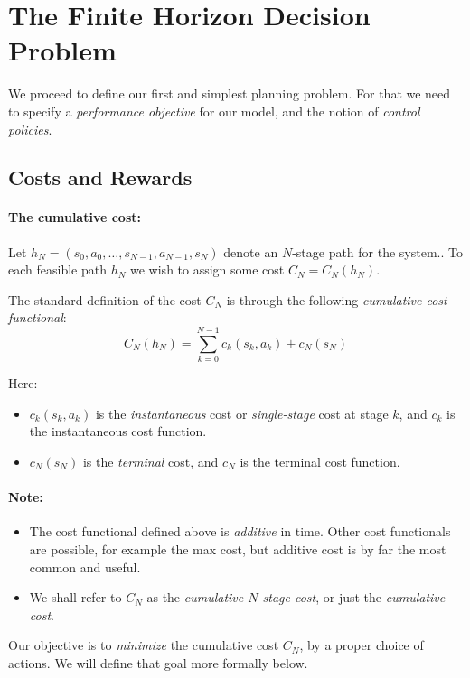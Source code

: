 \section{The Finite Horizon Decision Problem}

We proceed to define our first and simplest planning problem. For that we need to specify a \emph{performance objective} for our model, and the notion of \emph{control policies}.

\subsection{Costs and Rewards}

\paragraph{The cumulative cost:}  Let ${h_N} = ({s_0},{a_0}, \ldots ,{s_{N - 1}},{a_{N - 1}},{s_N})$ denote an $N$-stage path for the system..  To each feasible path ${h_N}$ we wish to assign some cost ${C_N} = {C_N}({h_N})$.

The standard definition of the cost ${C_N}$ is through the following \emph{cumulative cost functional}:
\[{C_N}({h_N}) = \sum\limits_{k = 0}^{N - 1} {{c_k}({s_k},{a_k}) + {c_N}({s_N})} \]

Here:
 	\begin{itemize}
    \item ${c_k}({s_k},{a_k})$ is the \emph{instantaneous}  cost or \emph{single-stage }cost at stage $k$, and ${c_k}$ is the instantaneous cost function.
    \item ${c_N}({s_N})$ is the \emph{terminal} cost, and ${c_N}$ is the terminal cost function.
  \end{itemize}

\paragraph{Note:}
\begin{itemize}
  \item The cost functional defined above is \emph{additive} in time. Other cost functionals are possible, for example the max cost, but additive cost is by far the most common and useful.
  \item We shall refer to ${C_N}$ as the \emph{cumulative $N$-stage cost}, or just the \emph{cumulative cost}.
\end{itemize}

Our objective is to \emph{minimize} the cumulative cost ${C_N}$, by a proper choice of actions. We will define that goal more formally below.

